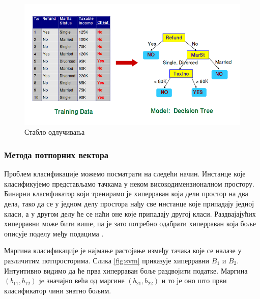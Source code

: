 \documentclass[a4paper]{article}
\begin{document}
{\begin{figure}[h!]
\begin{center}
\includegraphics[scale=0.4]{decision_tree.png}
\end{center}
\caption{Стабло одлучивања}
\label{fig:stablo}
\end{figure}


\subsubsection*{Метода потпорних вектора}
Проблем класификације можемо посматрати на следећи начин. Инстанце које класификујемо представљамо тачкама у неком високодимензионалном простору. Бинарни класификатор који тренирамо је хиперраван која дели простор на два дела, тако да се у једном делу простора нађу све инстанце које припадају једној класи, а у другом делу ће се наћи оне које припадају другој класи. Раздвајајућих хиперравни може бити више, па је зато потребно одабрати хиперраван која боље описује поделу међу подацима \cite{svm-intro}.


Маргина класификације је најмање растојање између тачака које се налазе у различитим потпросторима. Слика \ref{fig:svm} приказује хиперравни $B_1$ и $B_2$. Интуитивно видимо да ће прва хиперраван боље раздвојити податке. Маргина $(b_11, b_12)$ je значајно већа од маргине $(b_{21}, b_{22})$ и то је оно што први класификатор чини знатно бољим.

}
\end{document}
